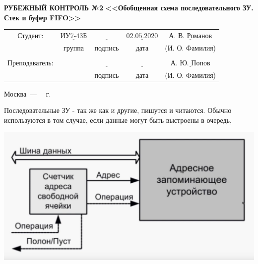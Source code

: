 \documentclass[a4paper,12pt]{article}
\begin{document}
	
	\begin{center}
		\noindent\begin{minipage}{1.3\textwidth}\centering
			\Large\textbf{  РУБЕЖНЫЙ КОНТРОЛЬ №2 }\newline
			\textbf{<<Обобщенная схема последовательного ЗУ.}\newline
			\textbf{Стек и буфер FIFO>>}\newline\newline\newline\newline
		\end{minipage}
	\end{center}
	
	\begin{center}
		\begin{tabular}{ccccc}
			Студент: & $\underline{\text{ИУ7-43Б}}$ & $\underline{\text{~~~~~~~~~~~}}$ & $\underline{\text{02.05.2020}}$ & $\underline{\text{А. В. Романов}}$ \\
			& \footnotesize группа & \footnotesize подпись & \footnotesize дата  & \footnotesize (И. О. Фамилия) \\
			&  &  &  & \\
			Преподаватель: & \textbf{} & $\underline{\text{~~~~~~~~~~~}}$ & $\underline{\text{~~~~~~~~~~~~}}$ & $\underline{\text{А. Ю. Попов}}$ \\
			&  & \footnotesize подпись & \footnotesize дата  & \footnotesize (И. О. Фамилия) \\
		\end{tabular}
	\end{center}
	
	
	\begin{center}
		\vfill
		Москва~---~\the\year
		~г.
	\end{center}
	\clearpage
	
	\noindent Последовательные ЗУ - так же как и другие, пишутся и читаются. Обычно используются в том случае, если данные могут быть выстроены в очередь, \newline
	
	\begin{center}
		\noindent \includegraphics[scale=0.4]{1.png}\newline
	\end{center}
	
\end{document}
